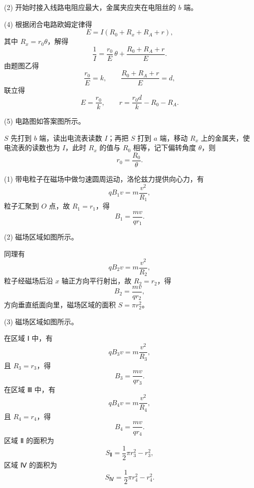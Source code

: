 \begin{answer}
(2) 开始时接入线路电阻应最大，金属夹应夹在电阻丝的 $b$ 端。

(4) 根据闭合电路欧姆定律得
\[
  E=I(R_{0}+R_{x}+R_{A}+r),
\]
其中 $R_{x}=r_{0}\theta$，解得
\[
  \frac{1}{I}=\frac{r_{0}}{E}\,\theta+\frac{R_{0}+R_{A}+r}{E}.
\]
由题图乙得
\[
  \frac{r_{0}}{E}=k,\qquad \frac{R_{0}+R_{A}+r}{E}=d,
\]
联立得
\[
  E=\frac{r_{0}}{k},\qquad r=\frac{r_{0}d}{k}-R_{0}-R_{A}.
\]

(5) 电路图如答案图所示。


$S$ 先打到 $b$ 端，读出电流表读数 $I$；再把 $S$ 打到 $a$ 端，移动 $R_{x}$ 上的金属夹，使电流表的读数也为 $I$，此时 $R_{x}$ 的值与 $R_{0}$ 相等，记下偏转角度 $\theta$，则
\[
  r_{0}=\frac{R_{0}}{\theta}.
\]
\end{answer}

\begin{answer}
(1) 带电粒子在磁场中做匀速圆周运动，洛伦兹力提供向心力，有
\[
  qB_{1}v=m\frac{v^{2}}{R_{1}},
\]
粒子汇聚到 $O$ 点，故 $R_{1}=r_{1}$，得
\[
  B_{1}=\frac{mv}{qr_{1}}.
\]

(2) 磁场区域如图所示。


同理有
\[
  qB_{2}v=m\frac{v^{2}}{R_{2}},
\]
粒子经磁场后沿 $x$ 轴正方向平行射出，故 $R_{2}=r_{2}$，得
\[
  B_{2}=\frac{mv}{qr_{2}},
\]
方向垂直纸面向里，磁场区域的面积 $S=\pi r_{2}^{2}$。

(3) 磁场区域如图所示。


在区域 Ⅰ 中，有
\[
  qB_{3}v=m\frac{v^{2}}{R_{3}},
\]
且 $R_{3}=r_{3}$，得
\[
  B_{3}=\frac{mv}{qr_{3}}.
\]
在区域 Ⅲ 中，有
\[
  qB_{4}v=m\frac{v^{2}}{R_{4}},
\]
且 $R_{4}=r_{4}$，得
\[
  B_{4}=\frac{mv}{qr_{4}}.
\]
区域 Ⅱ 的面积为
\[
  S_{\text{Ⅱ}}=\frac{1}{2}\pi r_{3}^{2}-r_{3}^{2},
\]
区域 Ⅳ 的面积为
\[
  S_{\text{Ⅳ}}=\frac{1}{2}\pi r_{4}^{2}-r_{4}^{2}.
\]
\end{answer}

